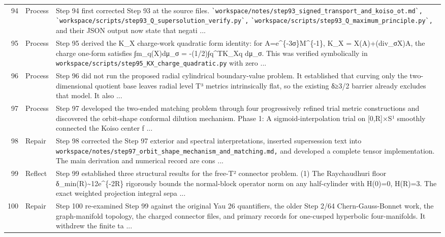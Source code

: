 \documentclass[UTF8,fontset=fandol,zihao=-4]{ctexart}
\begin{document}
\begin{longtable}{r p{} >{\raggedright\arraybackslash}p{}}
94 & Process & Step 94 first corrected Step 93 at the source files. \nolinkurl{`workspace/notes/step93_signed_transport_and_koiso_ot.md`,} \nolinkurl{`workspace/scripts/step93_Q_supersolution_verify.py`,} \nolinkurl{`workspace/scripts/step93_Q_maximum_principle.py`,} and their JSON output now state that negati ...\\
95 & Process & Step 95 derived the K\_X charge-work quadratic form identity: for A=e\textasciicircum{}\{-3σ\}M\textasciicircum{}\{-1\}, K\_X = X(A)+(div\_σX)A, the charge one-form satisfies ∫m\_q(X)dμ\_σ = -(1/2)∫q\textasciicircum{}TK\_Xq dμ\_σ. This was verified symbolically in \nolinkurl{workspace/scripts/step95_KX_charge_quadratic.py} with zero ...\\
96 & Process & Step 96 did not run the proposed radial cylindrical boundary-value problem. It established that curving only the two-dimensional quotient base leaves radial level T³ metrics intrinsically flat, so the existing δ≥3/2 barrier already excludes that model. It also ...\\
97 & Process & Step 97 developed the two-ended matching problem through four progressively refined trial metric constructions and discovered the orbit-shape conformal dilution mechanism. Phase 1: A sigmoid-interpolation trial on [0,R]×S¹ smoothly connected the Koiso center f ...\\
98 & Repair & Step 98 corrected the Step 97 exterior and spectral interpretations, inserted supersession text into \nolinkurl{workspace/notes/step97_orbit_shape_mechanism_and_matching.md,} and developed a complete tensor implementation. The main derivation and numerical record are cons ...\\
99 & Reflect & Step 99 established three structural results for the free-T² connector problem. (1) The Raychaudhuri floor δ\_min(R)\textasciitilde{}12e\textasciicircum{}\{-2R\} rigorously bounds the normal-block operator norm on any half-cylinder with H(0)=0, H(R)=3. The exact weighted projection integral sepa ...\\
100 & Repair & Step 100 re-examined Step 99 against the original Yau 26 quantifiers, the older Step 2/64 Chern-Gauss-Bonnet work, the graph-manifold topology, the charged connector files, and primary records for one-cusped hyperbolic four-manifolds. It withdrew the finite ta ...\\
\bottomrule\end{longtable}
\normalfont\normalsize
\end{document}
